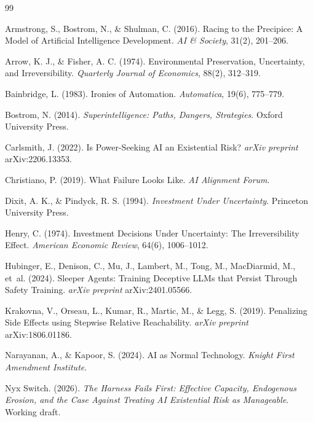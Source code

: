 \documentclass[11pt]{article}
\begin{document}
\begin{thebibliography}{99}
\setlength{\itemsep}{0.25em}

Armstrong, S., Bostrom, N., \& Shulman, C. (2016). Racing to the Precipice: A Model of Artificial Intelligence Development. \textit{AI \& Society}, 31(2), 201--206.

Arrow, K. J., \& Fisher, A. C. (1974). Environmental Preservation, Uncertainty, and Irreversibility. \textit{Quarterly Journal of Economics}, 88(2), 312--319.

Bainbridge, L. (1983). Ironies of Automation. \textit{Automatica}, 19(6), 775--779.

Bostrom, N. (2014). \textit{Superintelligence: Paths, Dangers, Strategies}. Oxford University Press.

Carlsmith, J. (2022). Is Power-Seeking AI an Existential Risk? \textit{arXiv preprint} arXiv:2206.13353.

Christiano, P. (2019). What Failure Looks Like. \textit{AI Alignment Forum}.

Dixit, A. K., \& Pindyck, R. S. (1994). \textit{Investment Under Uncertainty}. Princeton University Press.

Henry, C. (1974). Investment Decisions Under Uncertainty: The Irreversibility Effect. \textit{American Economic Review}, 64(6), 1006--1012.

Hubinger, E., Denison, C., Mu, J., Lambert, M., Tong, M., MacDiarmid, M., et~al. (2024). Sleeper Agents: Training Deceptive LLMs that Persist Through Safety Training. \textit{arXiv preprint} arXiv:2401.05566.

Krakovna, V., Orseau, L., Kumar, R., Martic, M., \& Legg, S. (2019). Penalizing Side Effects using Stepwise Relative Reachability. \textit{arXiv preprint} arXiv:1806.01186.

Narayanan, A., \& Kapoor, S. (2024). AI as Normal Technology. \textit{Knight First Amendment Institute}.

Nyx Switch. (2026). \textit{The Harness Fails First: Effective Capacity, Endogenous Erosion, and the Case Against Treating AI Existential Risk as Manageable}. Working draft.


\end{thebibliography}
\end{document}
